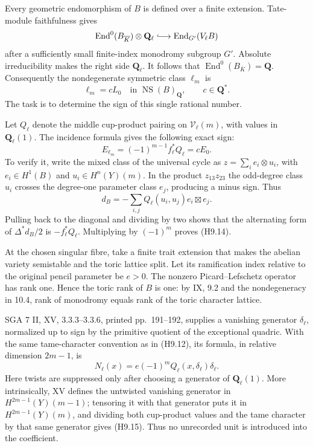 \documentclass[11pt,a4paper]{article}
\begin{document}
Every geometric endomorphism of $B$ is defined over a finite extension.
Tate-module faithfulness gives
\[
 \operatorname{End}^0(B_{\overline K})\otimes\mathbf Q_\ell
   \lhook\joinrel\longrightarrow
 \operatorname{End}_{G'}(V_\ell B)
\]
after a sufficiently small finite-index monodromy subgroup $G'$.
Absolute irreducibility makes the right side $\mathbf Q_\ell$.
It follows that $\operatorname{End}^0(B_{\overline K})=\mathbf Q$.
Consequently the nondegenerate symmetric class $\ell_m$ is
\[
 \ell_m=c L_0\quad\text{in }\operatorname{NS}(B)_{\mathbf Q},
 \qquad c\in\mathbf Q^* .                              \tag{H9.13}
\]
The task is to determine the sign of this single rational number.

Let $Q_\ell$ denote the middle cup-product pairing on
$\mathcal V_\ell(m)$, with values in $\mathbf Q_\ell(1)$.
The incidence formula gives the following exact sign:
\[
 E_{\ell_m}=(-1)^{m-1}f_\ell^*Q_\ell=cE_0.            \tag{H9.14}
\]
To verify it, write the mixed class of the universal cycle as
$z=\sum_i e_i\otimes u_i$, with $e_i\in H^1(B)$ and
$u_i\in H^n(Y)(m)$. In the product $z_{13}z_{23}$ the odd-degree
class $u_i$ crosses the degree-one parameter class $e_j$, producing
a minus sign. Thus
\[
 d_B=-\sum_{i,j}Q_\ell(u_i,u_j)e_i\boxtimes e_j.
\]
Pulling back to the diagonal and dividing by two shows that the
alternating form of $\Delta^*d_B/2$ is $-f_\ell^*Q_\ell$.
Multiplying by $(-1)^m$ proves (H9.14).

At the chosen singular fibre, take a finite trait extension that makes
the abelian variety semistable and the toric lattice split. Let its
ramification index relative to the original pencil parameter be $e>0$.
The nonzero Picard--Lefschetz operator has rank one. Hence the toric rank
of $B$ is one: by IX, 9.2 and the nondegeneracy in 10.4, rank of monodromy
equals rank of the toric character lattice.

SGA 7 II, XV, 3.3.3--3.3.6, printed pp.~191--192, supplies a vanishing generator
$\delta_\ell$, normalized up to sign by the primitive quotient of the
exceptional quadric. With the same tame-character convention as in
(H9.12), its formula, in relative dimension $2m-1$, is
\[
 N_\ell(x)=e(-1)^m Q_\ell(x,\delta_\ell)\delta_\ell.
                                                        \tag{H9.15}
\]
Here twists are suppressed only after choosing a generator of
$\mathbf Q_\ell(1)$. More intrinsically, XV defines the untwisted
vanishing generator in $H^{2m-1}(Y)(m-1)$; tensoring it with that
generator puts it in $H^{2m-1}(Y)(m)$, and dividing both cup-product
values and the tame character by that same generator gives (H9.15).
Thus no unrecorded unit is introduced into the coefficient.
\end{document}
